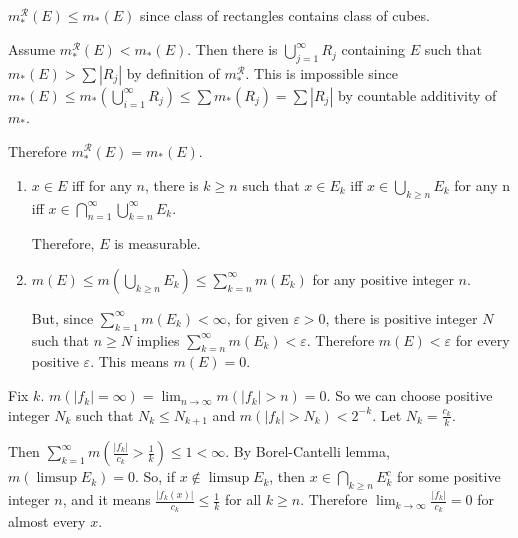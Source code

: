 \begin{problem}[1.15] \hfill

	$m_{*}^{\mathcal{R}}(E) \leq m_{*}(E)$ since class of rectangles contains class of cubes.

	Assume $m_{*}^{\mathcal{R}}(E) < m_{*}(E)$. Then there is $\bigcup_{j=1}^{\infty}R_j$ containing $E$ such that $m_{*}(E) > \sum |R_j|$ by definition of $m_{*}^{\mathcal{R}}$. This is impossible since $m_{*}(E) \leq m_{*}(\bigcup_{i=1}^\infty R_j ) \leq \sum m_{*}(R_j) = \sum |R_j|$ by countable additivity of $m_*$.
	
	Therefore $m_*^\mathcal{R}(E) = m_*(E)$.
\end{problem}

\begin{problem}[1.16] \hfill
	\begin{enumerate}[label = (\alph*)]
		\item $x \in E$ iff for any $n$, there is $k \geq n$ such that $x \in E_k$ iff $x \in \bigcup_{k \geq n} E_k$ for any n iff $x \in \bigcap_{n=1}^\infty \bigcup_{k=n}^\infty E_k$. 

			Therefore, $E$ is measurable.

		\item $m(E) \leq m\left( \bigcup_{k\geq n} E_k \right) \leq \sum_{k=n}^{\infty}m(E_k)$ for any positive integer $n$. 

			But, since $\sum_{k=1}^\infty m(E_k) < \infty$, for given $\varepsilon >0$, there is positive integer $N$ such that $n\geq N$ implies $\sum_{k=n}^\infty m(E_k) < \varepsilon$.
			Therefore $m(E) < \varepsilon$ for every positive $\varepsilon$. This means $m(E) = 0$.

	\end{enumerate}
	
\end{problem}

\begin{problem}[1.17] \hfill

	Fix $k$. $m\left( |f_k| = \infty \right) = \lim_{n\rightarrow \infty}m\left( |f_k| > n \right) = 0$. So we can choose positive integer $N_k$ such that $N_k \leq N_{k+1}$ and $m\left( |f_k| >N_k \right) < 2^{-k}$. Let $N_k = \frac{c_k}{k}$.

	Then $\sum_{k=1}^\infty m\left( \frac{|f_k|}{c_k} > \frac{1}{k} \right) \leq 1 < \infty$.
	By Borel-Cantelli lemma, $m\left( \limsup E_k \right) = 0$. So, if $x \notin \limsup E_k$, then $x \in \bigcap_{k \geq n} E_k^c$ for some positive integer $n$, and it means $\frac{|f_k(x)|}{c_k} \leq \frac{1}{k}$ for all $k \geq n$. Therefore $\lim_{k \rightarrow \infty} \frac{|f_k|}{c_k} = 0$ for almost every $x$.
\end{problem}

